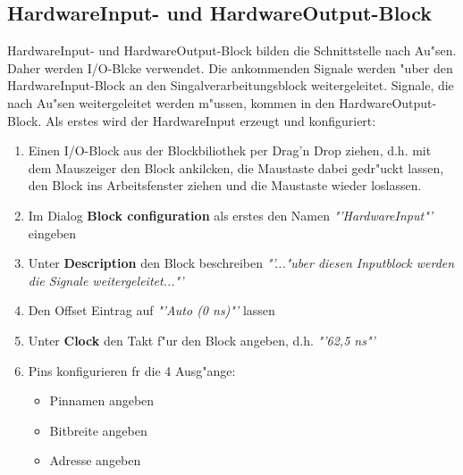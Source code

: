 \subsection{HardwareInput- und HardwareOutput-Block}
HardwareInput- und HardwareOutput-Block bilden die Schnittstelle nach Au"sen. Daher werden I/O-Blcke verwendet. Die ankommenden Signale werden "uber den HardwareInput-Block an den Singalverarbeitungsblock weitergeleitet. Signale, die nach Au"sen weitergeleitet werden m"ussen, kommen in den HardwareOutput-Block. Als erstes wird der HardwareInput erzeugt und konfiguriert:
\begin{enumerate}
	\item Einen I/O-Block aus der Blockbiliothek per Drag'n Drop ziehen, d.h. mit dem Mauszeiger den Block ankilcken, die Maustaste dabei gedr"uckt lassen, den Block ins Arbeitsfenster ziehen und die Maustaste wieder loslassen.
	\item Im Dialog {\bf Block configuration} als erstes den Namen {\itshape "'HardwareInput"'} eingeben
	\item Unter {\bf Description} den Block beschreiben {\itshape "'..."uber diesen Inputblock werden die Signale weitergeleitet..."'}
	\item Den Offset Eintrag auf {\itshape "'Auto (0 ns)"'} lassen
	\item Unter {\bf Clock} den Takt f"ur den Block angeben, d.h. {\itshape "'62,5 ns"'}
	\item Pins konfigurieren fr die 4 Ausg"ange:
		\begin{itemize}
			\item Pinnamen angeben
			\item Bitbreite angeben
			\item Adresse angeben
		\end{itemize}
\end{enumerate}
